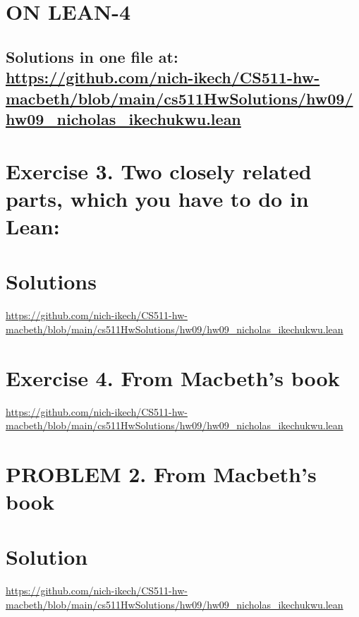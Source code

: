 \documentclass{article}
\begin{document}
\newpage







\section*{ON LEAN-4}
\subsection*{Solutions in one file at: 
\url{https://github.com/nich-ikech/CS511-hw-macbeth/blob/main/cs511HwSolutions/hw09/hw09_nicholas_ikechukwu.lean}}

\newpage

\section*{Exercise 3. Two closely related parts, which you have to do in Lean:}
\section*{Solutions}
\url{https://github.com/nich-ikech/CS511-hw-macbeth/blob/main/cs511HwSolutions/hw09/hw09_nicholas_ikechukwu.lean}

\newpage

\section*{Exercise 4. From Macbeth's book}

\url{https://github.com/nich-ikech/CS511-hw-macbeth/blob/main/cs511HwSolutions/hw09/hw09_nicholas_ikechukwu.lean}

\newpage

\section*{PROBLEM 2. From Macbeth's book}
\section*{Solution}

\url{https://github.com/nich-ikech/CS511-hw-macbeth/blob/main/cs511HwSolutions/hw09/hw09_nicholas_ikechukwu.lean}
\end{document}
